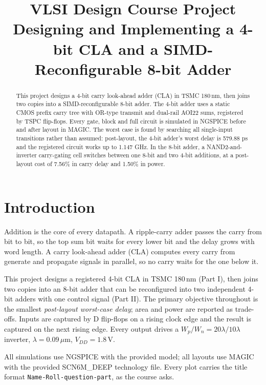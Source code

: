 \documentclass[conference,a4paper]{IEEEtran}
\begin{document}
\onecolumn
{\small\tableofcontents}
\clearpage
\twocolumn
\title{VLSI Design Course Project\\Designing and Implementing a 4-bit CLA and a SIMD-Reconfigurable 8-bit Adder}
\author{
}
\maketitle
\begin{abstract}
This project designs a 4-bit carry look-ahead adder (CLA) in TSMC 180\,nm, then joins two copies into a SIMD-reconfigurable 8-bit adder. The 4-bit adder uses a static CMOS prefix carry tree with OR-type transmit and dual-rail AOI22 sums, registered by TSPC flip-flops. Every gate, block and full circuit is simulated in NGSPICE before and after layout in MAGIC. The worst case is found by searching all single-input transitions rather than assumed: post-layout, the 4-bit adder's worst delay is 579.88 ps and the registered circuit works up to 1.147 GHz. In the 8-bit adder, a NAND2-and-inverter carry-gating cell switches between one 8-bit and two 4-bit additions, at a post-layout cost of 7.56\% in carry delay and 1.50\% in power.
\end{abstract}
\section{Introduction}
Addition is the core of every datapath. A ripple-carry adder passes the carry from bit to bit, so the top sum bit waits for every lower bit and the delay grows with word length. A carry look-ahead adder (CLA) computes every carry from generate and propagate signals in parallel, so no carry waits for the one below it.

This project designs a registered 4-bit CLA in TSMC 180\,nm (Part I), then joins two copies into an 8-bit adder that can be reconfigured into two independent 4-bit adders with one control signal (Part II). The primary objective throughout is the smallest \emph{post-layout worst-case delay}; area and power are reported as trade-offs. Inputs are captured by D flip-flops on a rising clock edge and the result is captured on the next rising edge. Every output drives a $W_p/W_n = 20\lambda/10\lambda$ inverter, $\lambda = 0.09\,\mu$m, $V_{DD} = 1.8$\,V.

All simulations use NGSPICE with the provided model; all layouts use MAGIC with the provided SCN6M\_DEEP technology file. Every plot carries the title format \texttt{Name-Roll-question-part}, as the course asks.
\end{document}
